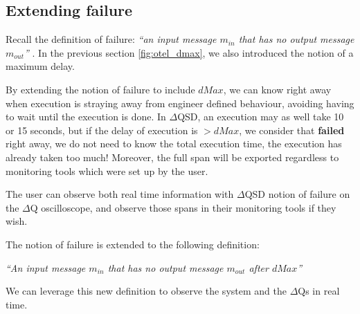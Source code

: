 \subsection{Extending failure}
   Recall the definition of failure: \textit{``an input message $m_{in}$ that has no output message $m_{out}$''} \cite{art}. In the previous section \ref{fig:otel_dmax}, we also introduced the notion of a maximum delay. 

   By extending the notion of failure to include $dMax$, we can know right away when execution is straying away from engineer defined behaviour, avoiding having to wait until the execution is done. In $\Delta$QSD, an execution may as well take 10 or 15 seconds, but if the delay of execution is $> dMax$, we consider that \textbf{failed} right away, we do not need to know the total execution time, the execution has already taken too much! Moreover, the full span will be exported regardless to monitoring tools which were set up by the user. 

   The user can observe both real time information with $\Delta$QSD notion of failure on the $\Delta$Q oscilloscope, and observe those spans in their monitoring tools if they wish.

The notion of failure is extended to the following definition:
        \begin{center}
            \textit{``An input message $m_{in}$ that has no output message $m_{out}$ after $dMax$''} 
        \end{center}
    We can leverage this new definition to observe the system and the $\Delta$Qs in real time.

